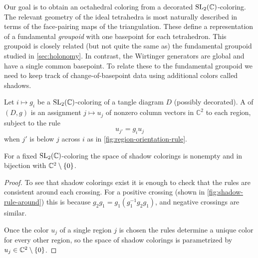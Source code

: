 \documentclass[leqno]{sl2art}
\begin{document}
Our goal is to obtain an octahedral coloring from a decorated \(\operatorname{SL}_2(\mathbb{C})\)-coloring.
The relevant geometry of the ideal tetrahedra is most naturally described in terms of the face-pairing maps of the triangulation.
These define a representation of a fundamental \emph{groupoid} with one basepoint for each tetrahedron.
This groupoid is closely related (but not quite the same as) the fundamental groupoid studied in \cref{sec:holonomy}.
In contrast, the Wirtinger generators are global and have a single common basepoint.
To relate these to the fundamental groupoid we need to keep track of change-of-basepoint data using additional colors called shadows.

\begin{definition}
  Let \(i \mapsto g_i\) be a \(\operatorname{SL}_2(\mathbb{C})\)-coloring of a tangle diagram \(D\) (possibly decorated).  
  A  of \((D,g)\) is an assignment \(j \mapsto u_j\) of nonzero column vectors in \(\mathbb{C}^{2}\) to each region, subject to the rule
  \[
    u_{j'} = g_i u_j
  \]
  when \(j'\) is below \(j\) across \(i\) as in \cref{fig:region-orientation-rule}.
\end{definition}

\begin{lemma}
  \label{thm:shadow-colors-free}
  For a fixed \(\operatorname{SL}_2(\mathbb{C})\)-coloring the space of shadow colorings is nonempty and in bijection with \(\mathbb{C}^2 \setminus \set{0}\).
\end{lemma}

\begin{marginfigure}
  \centering
  
  \caption{We can consistently assign colors to the regions around a positive crossing because \(g_2 g_1 = g_1 (g_1^{-1} g_2 g_1)\). Negative crossings are similar.}
  \label{fig:shadow-rule-around}
\end{marginfigure}

\begin{proof}
  To see that shadow colorings exist it is enough to check that the rules are consistent around each crossing.
  For a positive crossing (shown in \cref{fig:shadow-rule-around}) this is because \(g_2 g_1 = g_1 (g_1^{-1} g_2 g_1)\), and negative crossings are similar.

  Once the color \(u_j\) of a single region \(j\) is chosen the rules determine a unique color for every other region, so the space of shadow colorings is parametrized by \(u_j \in \mathbb{C}^{2} \setminus \set{0}\).
\end{proof}
\end{document}
